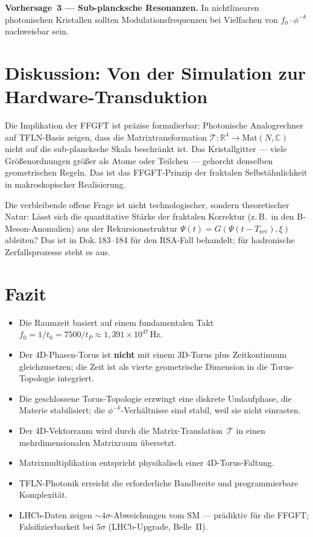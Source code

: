 \begin{predbox}
\textbf{Vorhersage~3 — Sub-plancksche Resonanzen.}
In nichtlinearen photonischen Kristallen sollten Modulationsfrequenzen
bei Vielfachen von $f_0\cdot\phi^{-k}$ nachweisbar sein.
\end{predbox}

\section{Diskussion: Von der Simulation zur Hardware-Transduktion}

Die Implikation der FFGFT ist präzise formulierbar: Photonische Analogrechner
auf TFLN-Basis zeigen, dass die Matrixtransformation
$\mathcal{T}: \mathbb{R}^4 \to \mathrm{Mat}(N,\mathbb{C})$
nicht auf die sub-plancksche Skala beschränkt ist. Das Kristallgitter
— viele Größenordnungen größer als Atome oder Teilchen — gehorcht
denselben geometrischen Regeln. Das ist das FFGFT-Prinzip der
fraktalen Selbstähnlichkeit in makroskopischer Realisierung.

Die verbleibende offene Frage ist nicht technologischer, sondern
theoretischer Natur: Lässt sich die quantitative Stärke der fraktalen
Korrektur (z.\,B.\ in den B-Meson-Anomalien) aus der Rekursionsstruktur
$\Psi(t) = G(\Psi(t-T_{\text{rev}}), \xi)$ ableiten?
Das ist in Dok.\,183--184 für den RSA-Fall behandelt;
für hadronische Zerfallsprozesse steht es aus.

\section{Fazit}

\begin{itemize}
  \item Die Raumzeit basiert auf einem fundamentalen Takt
        $f_0 = 1/t_0 = 7500/t_P \approx 1{,}391 \times 10^{47}\,\text{Hz}$.
  \item Der 4D-Phasen-Torus ist \textbf{nicht} mit einem 3D-Torus plus
        Zeitkontinuum gleichzusetzen; die Zeit ist als vierte geometrische
        Dimension in die Torus-Topologie integriert.
  \item Die geschlossene Torus-Topologie erzwingt eine diskrete
        Umlaufphase, die Materie stabilisiert; die $\phi^{-k}$-Verhältnisse
        sind stabil, weil sie nicht einrasten.
  \item Der 4D-Vektorraum wird durch die Matrix-Translation~$\mathcal{T}$
        in einen mehrdimensionalen Matrixraum übersetzt.
  \item Matrixmultiplikation entspricht physikalisch einer 4D-Torus-Faltung.
  \item TFLN-Photonik erreicht die erforderliche Bandbreite und
        programmierbare Komplexität.
  \item LHCb-Daten zeigen $\sim 4\sigma$-Abweichungen vom SM — prädiktiv
        für die FFGFT; Falsifizierbarkeit bei $5\sigma$ (LHCb-Upgrade, Belle~II).
\end{itemize}

